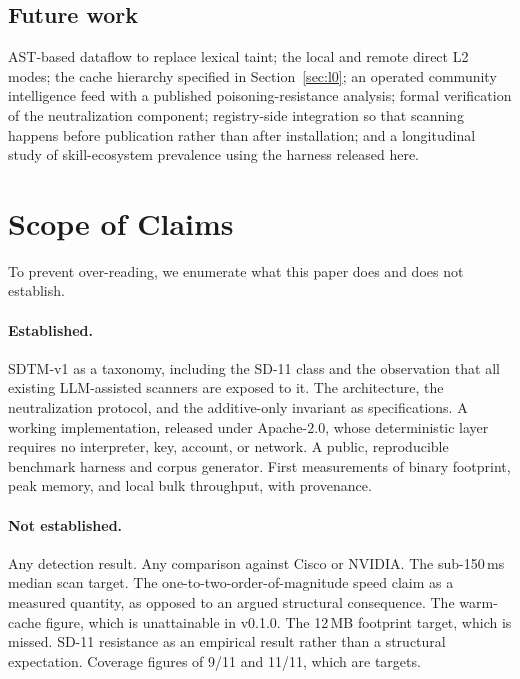 \documentclass[11pt]{article}
\begin{document}
\subsection{Future work}

AST-based dataflow to replace lexical taint; the local and remote direct L2 modes; the cache hierarchy specified in Section~\ref{sec:l0}; an operated community intelligence feed with a published poisoning-resistance analysis; formal verification of the neutralization component; registry-side integration so that scanning happens before publication rather than after installation; and a longitudinal study of skill-ecosystem prevalence using the harness released here.

\section{Scope of Claims}
\label{sec:scope}

To prevent over-reading, we enumerate what this paper does and does not establish.

\paragraph{Established.} SDTM-v1 as a taxonomy, including the SD-11 class and the observation that all existing LLM-assisted scanners are exposed to it. The architecture, the neutralization protocol, and the additive-only invariant as specifications. A working implementation, released under Apache-2.0, whose deterministic layer requires no interpreter, key, account, or network. A public, reproducible benchmark harness and corpus generator. First measurements of binary footprint, peak memory, and local bulk throughput, with provenance.

\paragraph{Not established.} Any detection result. Any comparison against Cisco or NVIDIA. The sub-150\,ms median scan target. The one-to-two-order-of-magnitude speed claim as a measured quantity, as opposed to an argued structural consequence. The warm-cache figure, which is unattainable in v0.1.0. The 12\,MB footprint target, which is missed. SD-11 resistance as an empirical result rather than a structural expectation. Coverage figures of 9/11 and 11/11, which are targets.
\end{document}
